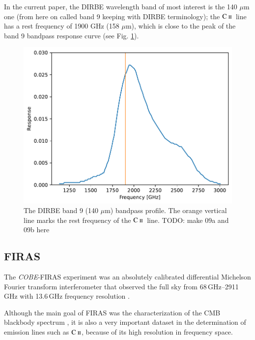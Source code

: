\documentclass{aa}
\newcommand{\mathsc}[1]{{\normalfont\textsc{#1}}}
\def\COBE{\textit{COBE}}
\newcommand{\cii}{\ensuremath{\mathsc {C\ ii}}}
\begin{document}
In the current paper, the DIRBE wavelength band of most interest is the 140
$\mu$m one (from here on called band 9 keeping with DIRBE terminology); the
\cii\ line has a rest frequency of 1900 GHz (158 $\mu$m), which is close to the
peak of the band 9 bandpass response curve (see Fig. \ref{fig:140_bp}).

\begin{figure}
    \centering
    \includegraphics[width=\columnwidth]{figures/dirbe_09_bandpass_vs_cii.pdf}
    \caption{The DIRBE band 9 (140 $\mu$m) bandpass profile. The orange
             vertical line marks the rest frequency of the \cii\ line. TODO:
            make 09a and 09b here}
    \label{fig:140_bp}
\end{figure}

\subsection{FIRAS}
The \COBE-FIRAS experiment was an absolutely calibrated differential Michelson
Fourier transform interferometer that observed the full sky from
68\,GHz--2911\,GHz with 13.6\,GHz frequency resolution
\citep{fixsen:1994,mather:1999}. 

Although the main goal of FIRAS was the characterization of the CMB blackbody
spectrum \citep{mather:1994}, it is also a very important dataset in the
determination of emission lines such as \cii, because of its high resolution in
frequency space.
\end{document}

